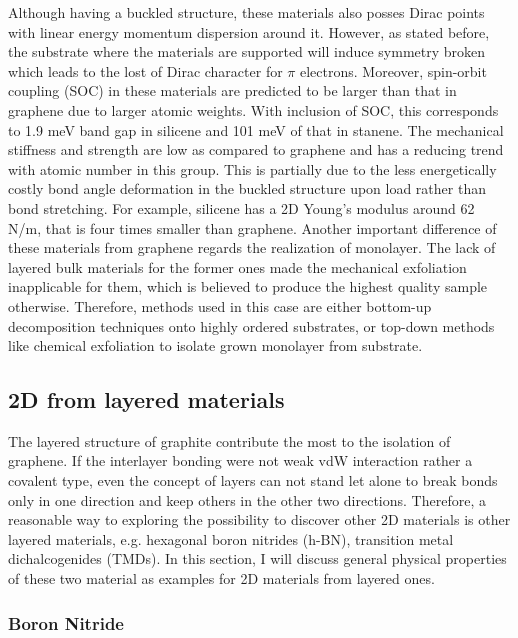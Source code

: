 Although having a buckled structure, these materials also posses Dirac points with linear energy momentum dispersion around it\cite{Garcia2011}.  However, as stated before, the substrate where the materials are supported will induce symmetry broken which leads to the lost of Dirac character for $\pi$ electrons\cite{Lin2013}. Moreover, spin-orbit coupling (SOC) in these materials are predicted to be larger than that in graphene due to larger atomic weights. With inclusion of SOC, this corresponds to 1.9 meV band gap in silicene  and 101 meV of that in stanene\cite{matthes2013}. The mechanical stiffness and strength are low as compared to graphene and has a reducing trend with atomic number in this group. This is partially due to the less energetically costly bond angle deformation in the buckled structure upon load rather than bond stretching\cite{Manjanath2014}. For example, silicene has a 2D Young's modulus around 62 \si{N/m}, that is four times smaller than graphene. Another important difference of these materials from graphene regards the realization of monolayer. The lack of layered bulk materials for the former ones made the mechanical exfoliation inapplicable for them, which is believed to produce the highest quality sample otherwise. Therefore, methods used in this case are either bottom-up decomposition techniques onto highly ordered substrates\cite{vogt2012,li2014}, or top-down methods like chemical exfoliation to isolate grown monolayer from substrate\cite{lin2012,kaloni2013}.


\subsection{2D from layered materials}

The layered structure of graphite contribute the most to the isolation of graphene. If the interlayer bonding were not weak vdW interaction rather a covalent type, even the concept of layers can not stand let alone to break bonds only in one direction and keep others in the other two directions. Therefore, a reasonable way to exploring the possibility to discover other 2D materials is other layered materials, e.g. hexagonal boron nitrides (h-BN), transition metal dichalcogenides (TMDs). In this section, I will discuss general physical properties of these two material as examples for 2D materials from layered ones.

\subsubsection{Boron Nitride}


